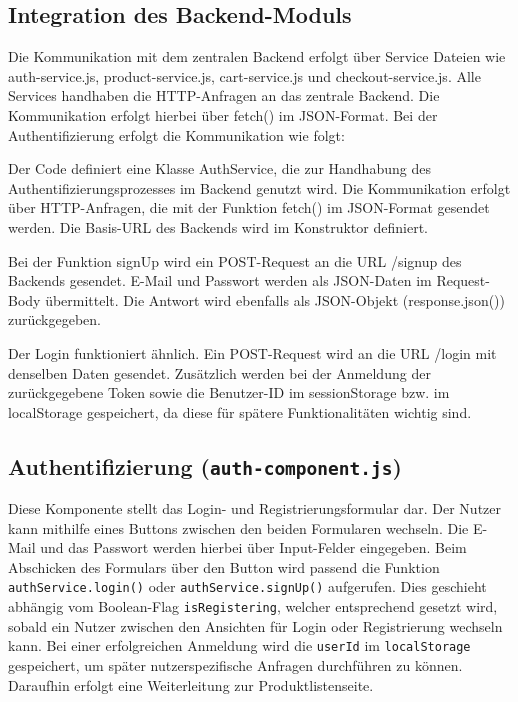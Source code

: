 \documentclass[oneside]{ausarbeitung}
\begin{document}
\subsection{Integration des Backend-Moduls}

Die Kommunikation mit dem zentralen Backend erfolgt über Service Dateien wie auth-service.js, product-service.js, cart-service.js und checkout-service.js. 
Alle Services handhaben die \ac{HTTP}-Anfragen an das zentrale Backend. Die Kommunikation erfolgt hierbei über fetch() im JSON-Format. 
Bei der Authentifizierung erfolgt die Kommunikation wie folgt: 

Der Code definiert eine Klasse AuthService, die zur Handhabung des Authentifizierungsprozesses im Backend genutzt wird. Die Kommunikation erfolgt über \ac{HTTP}-Anfragen, die mit der Funktion fetch() im JSON-Format gesendet werden. Die Basis-URL des Backends wird im Konstruktor definiert. 

Bei der Funktion signUp wird ein POST-Request an die URL /signup des Backends gesendet. E-Mail und Passwort werden als JSON-Daten im Request-Body übermittelt. Die Antwort wird ebenfalls als JSON-Objekt (response.json()) zurückgegeben. 

Der Login funktioniert ähnlich. Ein POST-Request wird an die URL /login mit denselben Daten gesendet. Zusätzlich werden bei der Anmeldung der zurückgegebene Token sowie die Benutzer-ID im sessionStorage bzw. im localStorage gespeichert, da diese für spätere Funktionalitäten wichtig sind.

\subsection{Authentifizierung (\texttt{auth-component.js})}

Diese Komponente stellt das Login- und Registrierungsformular dar. Der Nutzer kann mithilfe eines Buttons zwischen den beiden Formularen wechseln. Die E-Mail und das Passwort werden hierbei über Input-Felder eingegeben. Beim Abschicken des Formulars über den Button wird passend die Funktion \texttt{authService.login()} oder \texttt{authService.signUp()} aufgerufen. Dies geschieht abhängig vom Boolean-Flag \texttt{isRegistering}, welcher entsprechend gesetzt wird, sobald ein Nutzer zwischen den Ansichten für Login oder Registrierung wechseln kann. Bei einer erfolgreichen Anmeldung wird die \texttt{userId} im \texttt{localStorage} gespeichert, um später nutzerspezifische Anfragen durchführen zu können. Daraufhin erfolgt eine Weiterleitung zur Produktlistenseite.
\end{document}
